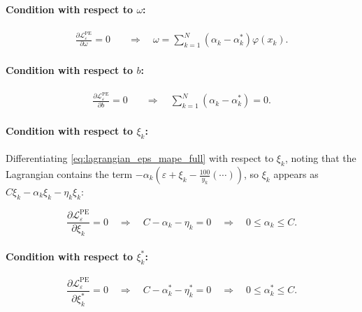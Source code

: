 \documentclass[mathematics,article,submit,pdftex,moreauthors]{Definitions/mdpi}
\begin{document}
\paragraph{Condition with respect to $\omega$:}
\begin{linenomath}
\begin{align}
\frac{\partial\mathcal{L}_{\varepsilon}^{\mathrm{PE}}}{\partial\omega} = 0 
&\quad \Rightarrow \quad 
\omega = \sum_{k=1}^N (\alpha_k - \alpha_k^*)\varphi(x_k). \label{eq:kkt_eps_omega_app}
\end{align}
\end{linenomath}

\paragraph{Condition with respect to $b$:}
\begin{linenomath}
\begin{align}
\frac{\partial\mathcal{L}_{\varepsilon}^{\mathrm{PE}}}{\partial b} = 0 
&\quad \Rightarrow \quad 
\sum_{k=1}^N (\alpha_k - \alpha_k^*) = 0. \label{eq:kkt_eps_b_app}
\end{align}
\end{linenomath}

\paragraph{Condition with respect to $\xi_k$:}

Differentiating \eqref{eq:lagrangian_eps_mape_full} with respect to $\xi_k$, noting that the
Lagrangian contains the term $-\alpha_k(\varepsilon + \xi_k - \frac{100}{y_k}(\cdots))$,
so $\xi_k$ appears as $C\xi_k - \alpha_k\xi_k - \eta_k\xi_k$:
\begin{linenomath}
\begin{equation}\label{eq:kkt_eps_xi_app}
\frac{\partial\mathcal{L}_{\varepsilon}^{\mathrm{PE}}}{\partial\xi_k} = 0 
\quad \Rightarrow \quad 
C - \alpha_k - \eta_k = 0
\quad \Rightarrow \quad
0 \leq \alpha_k \leq C.
\end{equation}
\end{linenomath}

\paragraph{Condition with respect to $\xi_k^*$:}
\begin{linenomath}
\begin{equation}\label{eq:kkt_eps_xistar_app}
\frac{\partial\mathcal{L}_{\varepsilon}^{\mathrm{PE}}}{\partial\xi_k^*} = 0 
\quad \Rightarrow \quad 
C - \alpha_k^* - \eta_k^* = 0
\quad \Rightarrow \quad
0 \leq \alpha_k^* \leq C.
\end{equation}
\end{linenomath}
\end{document}
